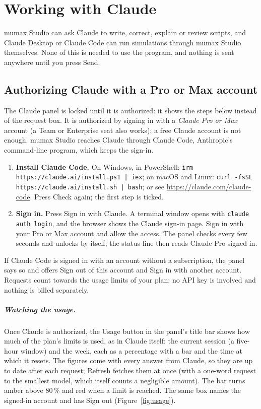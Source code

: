 \documentclass[11pt,a4paper,oneside]{book}
\newcommand{\code}[1]{\texttt{#1}}
\renewcommand{\_}{\textunderscore\allowbreak}
\newcommand{\menu}[1]{\textsf{#1}}
\begin{document}
\chapter{Working with Claude}\label{ch:claude}

mumax Studio can ask Claude to write, correct, explain or review scripts, and Claude Desktop or Claude Code can
run simulations through mumax Studio themselves. None of this is needed to use the program, and nothing is sent
anywhere until you press \menu{Send}.

\section{Authorizing Claude with a Pro or Max account}

The Claude panel is locked until it is authorized: it shows the steps below instead of the request box. It is
authorized by signing in with a \emph{Claude Pro or Max} account (a Team or Enterprise seat also works); a free
Claude account is not enough. mumax Studio reaches Claude through Claude Code, Anthropic's command-line program,
which keeps the sign-in.
\begin{enumerate}
\item \textbf{Install Claude Code.} On Windows, in PowerShell: \code{irm https://claude.ai/install.ps1 | iex};
on macOS and Linux: \code{curl -fsSL https://claude.ai/install.sh | bash}; or see
\url{https://claude.com/claude-code}. Press \menu{Check again}; the first step is ticked.
\item \textbf{Sign in.} Press \menu{Sign in with Claude}. A terminal window opens with \code{claude auth login},
and the browser shows the Claude sign-in page. Sign in with your Pro or Max account and allow the access. The
panel checks every few seconds and unlocks by itself; the status line then reads
\menu{Claude Pro \textperiodcentered{} signed in}.
\end{enumerate}
If Claude Code is signed in with an account without a subscription, the panel says so and offers
\menu{Sign out of this account} and \menu{Sign in with another account}. Requests count towards the usage limits
of your plan; no API key is involved and nothing is billed separately.

\paragraph{Watching the usage.} Once Claude is authorized, the \menu{Usage} button in the panel's title bar shows
how much of the plan's limits is used, as in Claude itself: the current session (a five-hour window) and the
week, each as a percentage with a bar and the time at which it resets. The figures come with every answer from
Claude, so they are up to date after each request; \menu{Refresh} fetches them at once (with a one-word request to
the smallest model, which itself counts a negligible amount). The bar turns amber above 80\,\% and red when a limit
is reached. The same box names the signed-in account and has \menu{Sign out} (Figure~\ref{fig:usage}).
\end{document}
